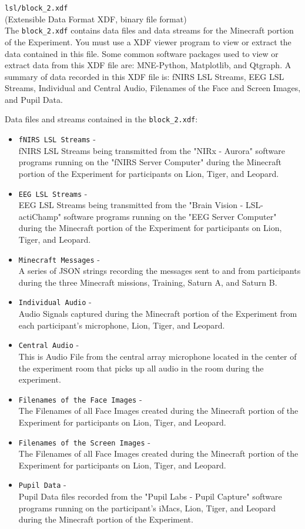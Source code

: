 \begin{description}
\medskip
\item\verb|lsl/block_2.xdf|\\(Extensible Data Format XDF, binary file format)\\
The \verb|block_2.xdf| contains data files and data streams for the Minecraft portion of the Experiment. You must use a XDF viewer program to view or extract the data contained in this file. Some common software packages used to view or extract data from this XDF file are: MNE-Python, Matplotlib, and Qtgraph. A summary of data recorded in this XDF file is: fNIRS LSL Streams, EEG LSL Streams, Individual and Central Audio, Filenames of the Face and Screen Images, and Pupil Data.

Data files and streams contained in the \verb|block_2.xdf|:
\begin{itemize}
    \item \verb|fNIRS LSL Streams| -\\fNIRS LSL Streams being transmitted from the "NIRx - Aurora" software programs running on the "fNIRS Server Computer" during the Minecraft portion of the Experiment for participants on Lion, Tiger, and Leopard.
    \item \verb|EEG LSL Streams| -\\EEG LSL Streams being transmitted from the "Brain Vision - LSL-actiChamp" software programs running on the "EEG Server Computer" during the Minecraft portion of the Experiment for participants on Lion, Tiger, and Leopard.
    \item \verb|Minecraft Messages| -\\A series of JSON strings recording the messages sent to and from participants during the three Minecraft missions, Training, Saturn A, and Saturn B.
    \item \verb|Individual Audio| -\\Audio Signals captured during the Minecraft portion of the Experiment from each participant's microphone, Lion, Tiger, and Leopard.
    \item \verb|Central Audio| -\\This is Audio File from the central array microphone located in the center of the experiment room that picks up all audio in the room during the experiment.
    \item \verb|Filenames of the Face Images| -\\The Filenames of all Face Images created during the Minecraft portion of the Experiment for participants on Lion, Tiger, and Leopard.
    \item \verb|Filenames of the Screen Images| -\\The Filenames of all Face Images created during the Minecraft portion of the Experiment for participants on Lion, Tiger, and Leopard.
    \item \verb|Pupil Data| -\\Pupil Data files recorded from the "Pupil Labs - Pupil Capture" software programs running on the participant's iMacs, Lion, Tiger, and Leopard during the Minecraft portion of the Experiment.
\end{itemize}


\end{description}
